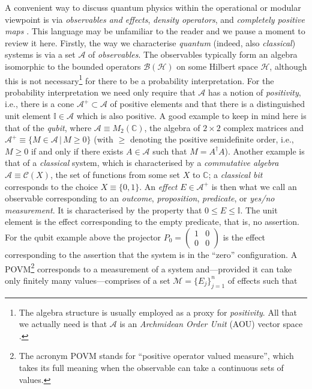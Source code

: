 \documentclass[11pt]{amsart}
\theoremstyle{plain}%
\theoremstyle{definition}
\theoremstyle{remark}
\begin{document}
A convenient way to discuss quantum physics within the operational or modular viewpoint is via \emph{observables and effects}, \emph{density operators}, and \emph{completely positive maps} \cite{ludwig_foundations_1983,davies_quantum_1976, beny_algebraic_2015}. This language may be unfamiliar to the reader and we pause a moment to review it here. Firstly, the way we characterise \emph{quantum} (indeed, also \emph{classical}) systems is via a set $\mathcal{A}$ of \emph{observables}. The observables typically form an algebra isomorphic to the bounded operators $\mathcal{B}(\mathcal{H})$ on some Hilbert space $\mathcal{H}$, although this is not necessary\footnote{The algebra structure is usually employed as a proxy for \emph{positivity}. All that we actually need is that $\mathcal{A}$ is an \emph{Archmidean Order Unit} (AOU) vector space \cite{paulsen_vector_2009,kleinmann_typical_2013}.} for there to be a probability interpretation. For the probability interpretation we need only require that $\mathcal{A}$ has a notion of \emph{positivity}, i.e., there is a cone $\mathcal{A}^+ \subset \mathcal{A}$ of positive elements and that there is a distinguished unit element $\mathbb{I}\in\mathcal{A}$ which is also positive. A good example to keep in mind here is that of the \emph{qubit}, where $\mathcal{A}\equiv M_2(\mathbb{C})$, the algebra of $2\times 2$ complex matrices and $\mathcal{A}^+ \equiv \{M\in \mathcal{A}\,|\, M\ge 0\}$ (with $\ge$ denoting the positive semidefinite order, i.e., $M\ge 0$ if and only if there exists $A\in \mathcal{A}$ such that $M = A^\dag A$). Another example is that of a \emph{classical} system, which is characterised by a \emph{commutative algebra} $\mathcal{A}\equiv \mathcal{C}(X)$, the set of functions from some set $X$ to $\mathbb{C}$; a \emph{classical bit} corresponds to the choice $X \equiv \{0,1\}$. An \emph{effect} $E\in\mathcal{A}^+$ is then what we call an observable corresponding to an \emph{outcome}, \emph{proposition}, \emph{predicate}, or \emph{yes/no measurement}. It is characterised by the property that $0\le E\le \mathbb{I}$. The unit element is the effect corresponding to the empty predicate, that is, no assertion. For the qubit example above the projector $P_0 = \left(\begin{smallmatrix} 1 & 0 \\ 0 & 0\end{smallmatrix}\right)$ is the effect corresponding to the assertion that the system is in the ``zero'' configuration. A POVM\footnote{The acronym POVM stands for ``positive operator valued measure'', which takes its full meaning when the observable can take a continuous sets of values. } corresponds to a measurement of a system and---provided it can take only finitely many values---comprises of a set $\mathcal{M} = \{E_j\}_{j=1}^n$ of effects such that 
\end{document}
